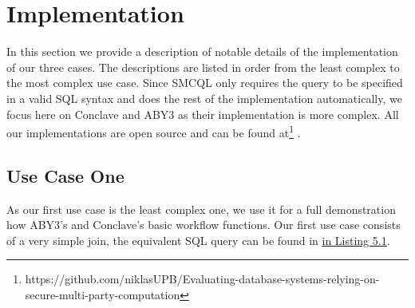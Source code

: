 \section{Implementation}
In this section we provide a description of notable details of the implementation of our three cases. 
The descriptions are listed in order from the least complex to the most complex use case. Since SMCQL only requires the query to be specified in a valid SQL syntax and does the rest of the implementation automatically, we focus here on Conclave and ABY3 as their implementation is more complex. All our implementations are open source and can be found at\footnote{https://github.com/niklasUPB/Evaluating-database-systems-relying-on-secure-multi-party-computation} .
\subsection{Use Case One}
As our first use case is the least complex one, we use it for a full demonstration how ABY3's and Conclave's basic workflow functions. Our first use case consists of a very simple join, the equivalent SQL query can be found in \hyperref[SQL1_label]{ in Listing 5.1}.
